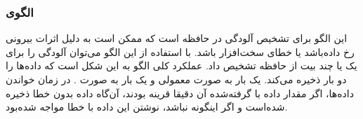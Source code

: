 \subsubsection{الگوی }
\label{safeOnesCompSec}
\begin{RTL}
این الگو برای تشخیص آلودگی در حافظه است که ممکن است به دلیل اثرات
بیرونی رخ داده‌باشد یا خطای سخت‌افزار باشد. با استفاده از این الگو
می‌توان آلودگی را برای یک یا چند بیت از حافظه تشخیص داد.
عملکرد کلی الگو به این شکل است که داده‌ها را دو بار ذخیره
می‌کند. یک بار به صورت معمولی و یک بار به صورت .
در زمان خواندن داده‌ها، اگر مقدار داده با 
گرفته‌شده آن دقیقا قرینه بودند، آن‌گاه داده بدون خطا ذخیره
شده‌است و اگر اینگونه نباشد، نوشتن این داده با خطا مواجه شده‌بود.
\end{RTL}